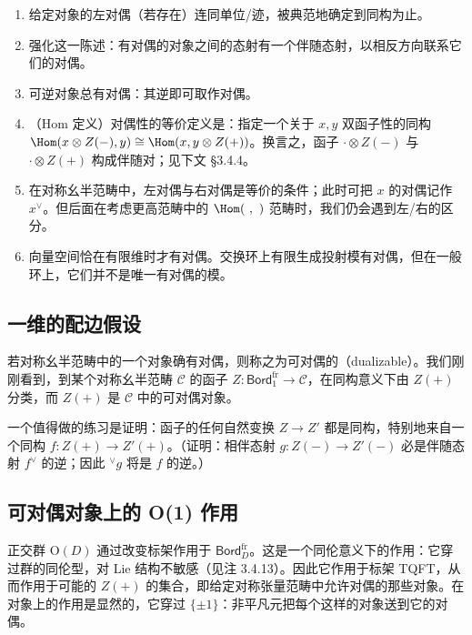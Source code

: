 \begin{remark}[对偶性]\label{rem:3.4.5}
\begin{enumerate}[label=(\roman*),leftmargin=3em]
\item 给定对象的左对偶（若存在）连同单位/迹，被典范地确定到同构为止。
\item 强化这一陈述：有对偶的对象之间的态射有一个伴随态射，以相反方向联系它们的对偶。
\item 可逆对象总有对偶：其逆即可取作对偶。
\item（Hom 定义）对偶性的等价定义是：指定一个关于 $x,y$ 双函子性的同构 $\Hom(x\otimes Z(-),y)\cong\Hom(x,y\otimes Z(+))$。换言之，函子 $\cdot\otimes Z(-)$ 与 $\cdot\otimes Z(+)$ 构成伴随对；见下文 §3.4.4。
\item 在对称幺半范畴中，左对偶与右对偶是等价的条件；此时可把 $x$ 的对偶记作 $x^\vee$。但后面在考虑更高范畴中的 $\Hom(\ ,\ )$ 范畴时，我们仍会遇到左/右的区分。
\item 向量空间恰在有限维时才有对偶。交换环上有限生成投射模有对偶，但在一般环上，它们并不是唯一有对偶的模。
\end{enumerate}
\end{remark}

\subsection{一维的配边假设}

若对称幺半范畴中的一个对象确有对偶，则称之为可对偶的（dualizable）。我们刚刚看到，到某个对称幺半范畴 $\mathcal{C}$ 的函子 $Z\colon\mathsf{Bord}^{\mathrm{fr}}_1\to\mathcal{C}$，在同构意义下由 $Z(+)$ 分类，而 $Z(+)$ 是 $\mathcal{C}$ 中的可对偶对象。

一个值得做的练习是证明：函子的任何自然变换 $Z\to Z'$ 都是同构，特别地来自一个同构 $f\colon Z(+)\to Z'(+)$。（证明：相伴态射 $g\colon Z(-)\to Z'(-)$ 必是伴随态射 $f^\vee$ 的逆；因此 ${}^\vee g$ 将是 $f$ 的逆。）

\subsection{可对偶对象上的 O(1) 作用}

正交群 $\mathrm{O}(D)$ 通过改变标架作用于 $\mathsf{Bord}^{\mathrm{fr}}_D$。这是一个同伦意义下的作用：它穿过群的同伦型，对 Lie 结构不敏感（见注 3.4.13）。因此它作用于标架 TQFT，从而作用于可能的 $Z(+)$ 的集合，即给定对称张量范畴中允许对偶的那些对象。在对象上的作用是显然的，它穿过 $\{\pm1\}$：非平凡元把每个这样的对象送到它的对偶。

